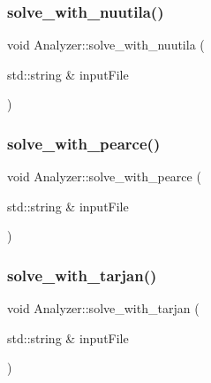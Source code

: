 \mbox{\label{class_analyzer_a5ac77dbb2bbea6b34af561272705d64e}} 
\subsubsection{\texorpdfstring{solve\+\_\+with\+\_\+nuutila()}{solve\_with\_nuutila()}}
{\footnotesize\ttfamily void Analyzer\+::solve\+\_\+with\+\_\+nuutila (\begin{DoxyParamCaption}\item[{std\+::string \&}]{input\+File }\end{DoxyParamCaption})}

\mbox{\label{class_analyzer_a6009c58addbb9730b54580a5f01ddce7}} 
\subsubsection{\texorpdfstring{solve\+\_\+with\+\_\+pearce()}{solve\_with\_pearce()}}
{\footnotesize\ttfamily void Analyzer\+::solve\+\_\+with\+\_\+pearce (\begin{DoxyParamCaption}\item[{std\+::string \&}]{input\+File }\end{DoxyParamCaption})}

\mbox{\label{class_analyzer_a8207cd71986d26dc8abda1a807490ab2}} 
\subsubsection{\texorpdfstring{solve\+\_\+with\+\_\+tarjan()}{solve\_with\_tarjan()}}
{\footnotesize\ttfamily void Analyzer\+::solve\+\_\+with\+\_\+tarjan (\begin{DoxyParamCaption}\item[{std\+::string \&}]{input\+File }\end{DoxyParamCaption})}



